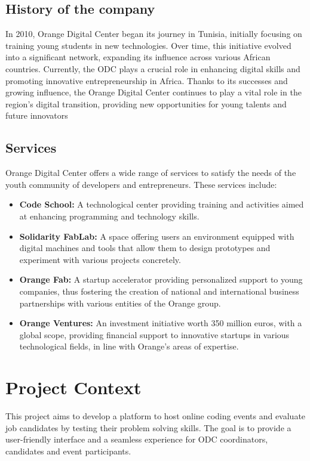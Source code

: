 \subsection{History of the company}
In 2010, Orange Digital Center began its journey in Tunisia, initially focusing
on training young students in new technologies. Over time, this initiative
evolved into a significant network, expanding its influence across various
African countries. Currently, the ODC plays a crucial role in enhancing digital
skills and promoting innovative entrepreneurship in Africa. Thanks to its
successes and growing influence, the Orange Digital Center continues to play a
vital role in the region's digital transition, providing new opportunities for
young talents and future innovators
\subsection{Services}
Orange Digital Center offers a wide range of services to satisfy the needs of
the youth community of developers and entrepreneurs. These services include:

\begin{itemize}
      \item \textbf{Code School:} A technological center providing training
            and activities aimed at enhancing programming and technology
            skills.
      \item \textbf{Solidarity FabLab:} A space offering users an environment
            equipped with digital machines and tools that allow them to
            design prototypes
            and experiment with various projects concretely.
      \item \textbf{Orange Fab:} A startup accelerator providing personalized
            support to young companies, thus fostering the creation of
            national and
            international business partnerships with various entities of the
            Orange group.
      \item \textbf{Orange Ventures:} An investment initiative worth 350
            million euros, with a global scope, providing financial support
            to innovative
            startups in various technological fields, in line with Orange's
            areas of
            expertise.
\end{itemize}

\section{Project Context}
This project aims to develop a platform to host online coding events and
evaluate job candidates by testing their problem solving skills. The goal
is to provide a user-friendly interface and a seamless experience for ODC
coordinators, candidates and event participants.


